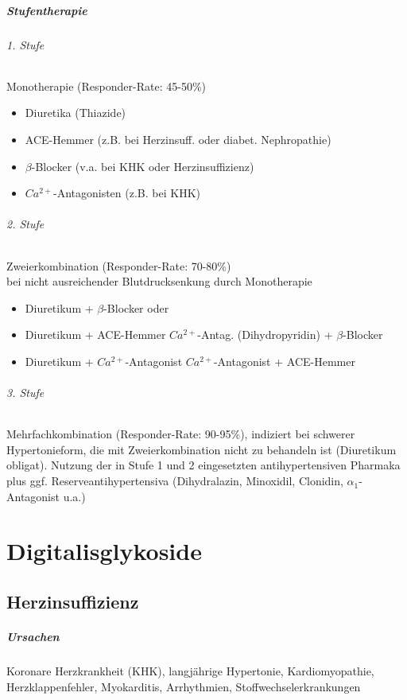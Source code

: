 \documentclass[10pt,a4paper]{report}
\begin{document}
\paragraph{Stufentherapie}
\subparagraph{1. Stufe} 	Monotherapie (Responder-Rate: 45-50\%)
\begin{itemize}
	\item Diuretika (Thiazide)
	\item ACE-Hemmer (z.B. bei Herzinsuff. oder diabet. Nephropathie)
	\item $\beta$-Blocker (v.a. bei KHK oder Herzinsuffizienz)
	\item $Ca^{2+}$-Antagonisten (z.B. bei KHK)
\end{itemize}		
\subparagraph{2. Stufe} 	Zweierkombination (Responder-Rate: 70-80\%) \\
bei nicht ausreichender Blutdrucksenkung durch Monotherapie
\begin{itemize}
	\item Diuretikum + $\beta$-Blocker oder
	\item Diuretikum + ACE-Hemmer $Ca^{2+}$-Antag. (Dihydropyridin) + $\beta$-Blocker			\item Diuretikum +	$Ca^{2+}$-Antagonist	$Ca^{2+}$-Antagonist + ACE-Hemmer
\end{itemize}		
\subparagraph{3. Stufe} Mehrfachkombination (Responder-Rate: 90-95\%), indiziert bei schwerer Hypertonieform, die mit Zweierkombination nicht zu behandeln ist (Diuretikum obligat). Nutzung der in Stufe 1 und 2 eingesetzten antihypertensiven Pharmaka  plus ggf. Reserveantihypertensiva (Dihydralazin, Minoxidil, Clonidin, $\alpha_1$-Antagonist u.a.)
\chapter{Digitalisglykoside}
\section{Herzinsuffizienz}
\paragraph{Ursachen} Koronare Herzkrankheit (KHK), langjährige Hypertonie, Kardiomyopathie, Herzklappenfehler, Myokarditis, Arrhythmien, Stoffwechselerkrankungen
\end{document}
